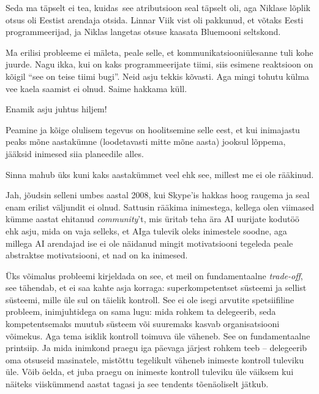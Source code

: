 Seda ma täpselt ei tea, kuidas see atributsioon seal täpselt oli, aga Niklase 
lõplik otsus oli Eestist arendaja otsida. 
Linnar Viik vist oli pakkunud, et võtaks Eesti 
programmeerijad, ja Niklas langetas otsuse kaasata Bluemooni 
seltskond.


Ma erilisi probleeme ei mäleta, peale 
selle, et kommunikatsiooniülesanne tuli kohe juurde. Nagu ikka, kui on kaks 
programmeerijate tiimi, siis esimene reaktsioon on kõigil \enquote{see on 
teise tiimi bugi}. Neid asju tekkis kõvasti. Aga 
mingi tohutu külma vee kaela saamist ei olnud. Saime hakkama küll. 


Enamik asju juhtus hiljem!


Peamine ja kõige olulisem tegevus on hoolitsemine selle eest, et kui 
inimajastu peaks mõne aastakümne (loodetavasti mitte mõne aasta) jooksul 
lõppema, jääksid inimesed siia planeedile alles.


Sinna mahub üks kuni kaks aastakümmet veel ehk see, millest me ei ole 
rääkinud. 


Jah, jõudsin selleni umbes aastal 2008, kui Skype'is hakkas hoog 
raugema ja seal enam erilist väljundit ei olnud. Sattusin rääkima 
inimestega, kellega olen viimased kümme aastat ehitanud 
\emph{community}'t, mis üritab teha ära AI uurijate kodutöö ehk 
asju, mida on vaja selleks, et AIga tulevik oleks inimestele soodne, aga 
millega AI arendajad ise ei ole näidanud mingit motivatsiooni tegeleda peale 
abstraktse motivatsiooni, et nad on ka inimesed.

Üks võimalus probleemi kirjeldada on see, et meil on fundamentaalne 
\emph{trade-off}, see tähendab, et ei saa 
kahte asja korraga: superkompetentset süsteemi ja sellist süsteemi, mille 
üle sul on täielik kontroll. See ei ole isegi arvutite spetsiifiline probleem, 
inimjuhtidega on sama lugu: mida rohkem ta delegeerib, seda 
kompetentsemaks muutub süsteem või suuremaks kasvab organisatsiooni võimekus. 
Aga tema isiklik kontroll toimuva üle väheneb. See on fundamentaalne 
printsiip. Ja mida inimkond praegu iga päevaga järjest rohkem teeb -- 
delegeerib oma otsuseid masinatele, mistõttu tegelikult 
väheneb inimeste kontroll tuleviku üle. Võib öelda, et juba praegu on inimeste 
kontroll tuleviku üle väiksem kui näiteks viiskümmend aastat tagasi ja see tendents tõenäoliselt jätkub. 

